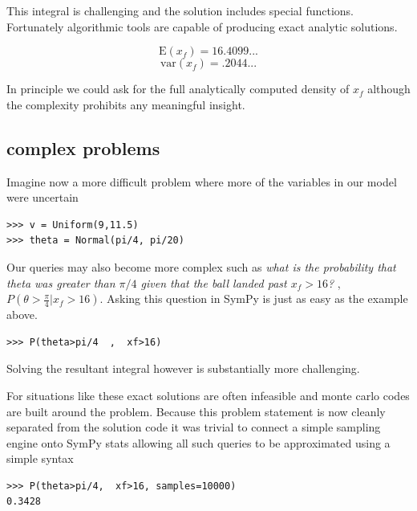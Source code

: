 This integral is challenging and the solution includes special functions. Fortunately algorithmic tools are capable of producing exact analytic solutions. 

$$\textrm{E}(x_f) = 16.4099...$$
$$\textrm{var}(x_f) = .2044...$$

In principle we could ask for the full analytically computed density of $x_f$ although the complexity prohibits any meaningful insight. 

\subsection{complex problems}

Imagine now a more difficult problem where more of the variables in our model were uncertain
\begin{lstlisting}
>>> v = Uniform(9,11.5)
>>> theta = Normal(pi/4, pi/20)
\end{lstlisting}

Our queries may also become more complex such as \textit{what is the probability that theta was greater than $\pi/4$ given that the ball landed past $x_f>16$?} , $P(\theta>\frac{\pi}{4} | x_f>16)$. Asking this question in SymPy is just as easy as the example above. 
\begin{lstlisting}
>>> P(theta>pi/4  ,  xf>16)
\end{lstlisting}
Solving the resultant integral however is substantially more challenging.

For situations like these exact solutions are often infeasible and monte carlo codes are built around the problem. Because this problem statement is now cleanly separated from the solution code it was trivial to connect a simple sampling engine onto SymPy stats allowing all such queries to be approximated using a simple syntax
\begin{lstlisting}
>>> P(theta>pi/4,  xf>16, samples=10000)
0.3428
\end{lstlisting}

